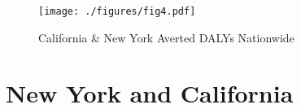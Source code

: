\documentclass{bioinfo}
\newcommand{\pEm}[1]{$\mathrm{PM}_{#1}$}
\newcommand{\vmt}{$\mathrm{VMT}$}
\begin{document}
\begin{methods}





\end{methods}

\begin{figure}[t]
  \centerline{\texttt{[image: ./figures/fig4.pdf]}}
    \caption{California \& New York Averted DALYs Nationwide}\label{California}
\end{figure}


\section{New York and California}
\end{document}
